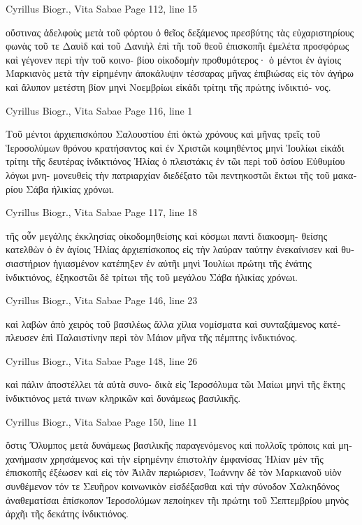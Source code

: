 \documentclass[12pt,letterpaper,twoside,final]{memoir}
\begin{document}
\begin{greek}
Cyrillus Biogr., Vita Sabae 
Page 112, line 15

οὕστινας ἀδελφοὺς μετὰ τοῦ φόρτου ὁ θεῖος δεξάμενος πρεσβύτης 
τὰς εὐχαριστηρίους φωνὰς τοῦ τε Δαυὶδ καὶ τοῦ Δανιὴλ ἐπὶ τῆι τοῦ 
θεοῦ ἐπισκοπῆι ἐμελέτα προσφόρως καὶ γέγονεν περὶ τὴν τοῦ κοινο-
βίου οἰκοδομὴν προθυμότερος· ὁ μέντοι ἐν ἁγίοις Μαρκιανὸς μετὰ τὴν 
εἰρημένην ἀποκάλυψιν τέσσαρας μῆνας ἐπιβιώσας εἰς τὸν ἀγήρω καὶ 
ἄλυπον μετέστη βίον μηνὶ Νοεμβρίωι εἰκάδι τρίτηι τῆς πρώτης ἰνδικτιό-
νος. 



Cyrillus Biogr., Vita Sabae 
Page 116, line 1

Τοῦ μέντοι ἀρχιεπισκόπου Σαλουστίου ἐπὶ ὀκτὼ χρόνους καὶ 
μῆνας τρεῖς τοῦ Ἱεροσολύμων θρόνου κρατήσαντος καὶ ἐν Χριστῶι   
κοιμηθέντος μηνὶ Ἰουλίωι εἰκάδι τρίτηι τῆς δευτέρας ἰνδικτιόνος 
Ἡλίας ὁ πλειστάκις ἐν τῶι περὶ τοῦ ὁσίου Εὐθυμίου λόγωι μνη-
μονευθεὶς τὴν πατριαρχίαν διεδέξατο τῶι πεντηκοστῶι ἕκτωι τῆς 
τοῦ μακαρίου Σάβα ἡλικίας χρόνωι. 



Cyrillus Biogr., Vita Sabae 
Page 117, line 18

                                                                   τῆς οὖν 
μεγάλης ἐκκλησίας οἰκοδομηθείσης καὶ κόσμωι παντὶ διακοσμη-
θείσης κατελθὼν ὁ ἐν ἁγίοις Ἡλίας ἀρχιεπίσκοπος εἰς τὴν λαύραν 
ταύτην ἐνεκαίνισεν καὶ θυσιαστήριον ἡγιασμένον κατέπηξεν ἐν 
αὐτῆι μηνὶ Ἰουλίωι πρώτηι τῆς ἐνάτης ἰνδικτιόνος, ἑξηκοστῶι δὲ 
τρίτωι τῆς τοῦ μεγάλου Σάβα ἡλικίας χρόνωι. 



Cyrillus Biogr., Vita Sabae 
Page 146, line 23

          καὶ λαβὼν ἀπὸ χειρὸς τοῦ βασιλέως ἄλλα χίλια νομίσματα 
καὶ συνταξάμενος κατέπλευσεν ἐπὶ Παλαιστίνην περὶ τὸν Μάιον 
μῆνα τῆς πέμπτης ἰνδικτιόνος. 



Cyrillus Biogr., Vita Sabae 
Page 148, line 26

                                   καὶ πάλιν ἀποστέλλει τὰ αὐτὰ συνο-
δικὰ εἰς Ἱεροσόλυμα τῶι Μαίωι μηνὶ τῆς ἕκτης ἰνδικτιόνος μετά 
τινων κληρικῶν καὶ δυνάμεως βασιλικῆς. 



Cyrillus Biogr., Vita Sabae 
Page 150, line 11

           ὅστις Ὄλυμπος μετὰ δυνάμεως βασιλικῆς παραγενόμενος 
καὶ πολλοῖς τρόποις καὶ μηχανήμασιν χρησάμενος καὶ τὴν εἰρημένην 
ἐπιστολὴν ἐμφανίσας Ἡλίαν μὲν τῆς ἐπισκοπῆς ἐξέωσεν καὶ εἰς 
τὸν Ἀιλᾶν περιώρισεν, Ἰωάννην δὲ τὸν Μαρκιανοῦ υἱὸν συνθέμενον 
τόν τε Σευῆρον κοινωνικὸν εἰσδέξασθαι καὶ τὴν σύνοδον Χαλκηδόνος 
ἀναθεματίσαι ἐπίσκοπον Ἱεροσολύμων πεποίηκεν τῆι πρώτηι τοῦ 
Σεπτεμβρίου μηνὸς ἀρχῆι τῆς δεκάτης ἰνδικτιόνος. 




\end{greek}
\end{document}
